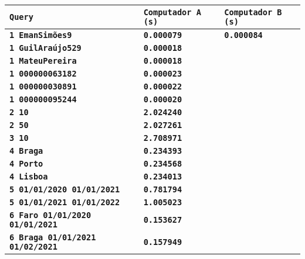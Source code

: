 \documentclass[12pt,a4paper]{report}
\begin{document}
{
\setlength\arrayrulewidth{1pt}
\begin{tabularx}{\textwidth} { 
  | >{\centering\arraybackslash}X
  | >{\centering\arraybackslash}X
  | >{\centering\arraybackslash}X | }
 \hline
 \texttt{\textbf{Query}} & \texttt{\textbf{Computador A (s)}} & \texttt{\textbf{Computador B (s)}} \\
 \hline
 \texttt{\textbf{1 EmanSimões9}} & \texttt{\textbf{0.000079}} & \texttt{\textbf{0.000084}} \\
 \hline
 \texttt{\textbf{1 GuilAraújo529}} & \texttt{\textbf{0.000018}} & \texttt{\textbf{}} \\
 \hline
 \texttt{\textbf{1 MateuPereira}} & \texttt{\textbf{0.000018}} & \texttt{\textbf{}} \\
 \hline
 \texttt{\textbf{1 000000063182}} & \texttt{\textbf{0.000023}} & \texttt{\textbf{}} \\
 \hline
 \texttt{\textbf{1 000000030891}} & \texttt{\textbf{0.000022}} & \texttt{\textbf{}} \\
 \hline
 \texttt{\textbf{1 000000095244}} & \texttt{\textbf{0.000020}} & \texttt{\textbf{}} \\
 \hline
 \texttt{\textbf{2 10}} & \texttt{\textbf{2.024240}} & \texttt{\textbf{}} \\
 \hline
 \texttt{\textbf{2 50}} & \texttt{\textbf{2.027261}} & \texttt{\textbf{}} \\
 \hline
 \texttt{\textbf{3 10}} & \texttt{\textbf{2.708971}} & \texttt{\textbf{}} \\
 \hline
 \texttt{\textbf{4 Braga}} & \texttt{\textbf{0.234393}} & \texttt{\textbf{}} \\
 \hline
 \texttt{\textbf{4 Porto}} & \texttt{\textbf{0.234568}} & \texttt{\textbf{}} \\
 \hline
 \texttt{\textbf{4 Lisboa}} & \texttt{\textbf{0.234013}} & \texttt{\textbf{}} \\
 \hline
 \texttt{\textbf{5 01/01/2020 01/01/2021}} & \vspace{-5pt}\texttt{\textbf{0.781794}} & \texttt{\textbf{}} \\
 \hline
 \texttt{\textbf{5 01/01/2021 01/01/2022}} & \vspace{-5pt}\texttt{\textbf{1.005023}} & \texttt{\textbf{}} \\
 \hline
 \texttt{\textbf{6 Faro 01/01/2020 01/01/2021}} & \vspace{-5pt}\texttt{\textbf{0.153627}} & \texttt{\textbf{}} \\
 \hline
 \texttt{\textbf{6 Braga 01/01/2021 01/02/2021}} & \vspace{-5pt}\texttt{\textbf{0.157949}} & \texttt{\textbf{}} \\

\end{tabularx}}
\end{document}

